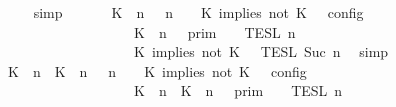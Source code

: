 \begin{isabellebody}
\ \ \ \ \isamarkupfalse%
\ simp\isanewline
\ \ \isamarkupfalse%
\ \isamarkupfalse%
\ {\isacartoucheopen}{\isasymlbrakk}\ {\isacharparenleft}{\isacharparenleft}K\ {\isasymnot}{\isasymUp}\ n{\isacharparenright}\ {\isacharhash}\ {\isasymGamma}{\isacharparenright}{\isacharcomma}\ n\ {\isasymturnstile}\ {\isasymPsi}\ {\isasymtriangleright}\ {\isacharparenleft}{\isacharparenleft}K\ implies\ not\ K\ {\isacharhash}\ {\isasymPhi}{\isacharparenright}\ {\isasymrbrakk}\isactrlsub c\isactrlsub o\isactrlsub n\isactrlsub f\isactrlsub i\isactrlsub g\isanewline
\ \ \ \ \ \ \ \ \ \ \ \ \ \ \ \ \ \ {\isacharequal}\ {\isasymlbrakk}{\isasymlbrakk}\ {\isacharparenleft}K\ {\isasymnot}{\isasymUp}\ n{\isacharparenright}\ {\isacharhash}\ {\isasymGamma}\ {\isasymrbrakk}{\isasymrbrakk}\isactrlsub p\isactrlsub r\isactrlsub i\isactrlsub m\ {\isasyminter}\ {\isasymlbrakk}{\isasymlbrakk}\ {\isasymPsi}\ {\isasymrbrakk}{\isasymrbrakk}\isactrlsub T\isactrlsub E\isactrlsub S\isactrlsub L\isactrlbsup {\isasymge}\ n\isactrlesup \isanewline
\ \ \ \ \ \ \ \ \ \ \ \ \ \ \ \ \ \ {\isasyminter}\ {\isasymlbrakk}{\isasymlbrakk}\ {\isacharparenleft}K\ implies\ not\ K\ {\isacharhash}\ {\isasymPhi}\ {\isasymrbrakk}{\isasymrbrakk}\isactrlsub T\isactrlsub E\isactrlsub S\isactrlsub L\isactrlbsup {\isasymge}\ Suc\ n\isactrlesup {\isacartoucheclose}\ \isamarkupfalse%
\ simp\isanewline
\ \ \isamarkupfalse%
\ \isamarkupfalse%
\ {\isacartoucheopen}{\isasymlbrakk}\ {\isacharparenleft}{\isacharparenleft}K\ {\isasymUp}\ n{\isacharparenright}\ {\isacharhash}\ {\isacharparenleft}K\ {\isasymnot}{\isasymUp}\ n{\isacharparenright}\ {\isacharhash}\ {\isasymGamma}{\isacharparenright}{\isacharcomma}\ n\ {\isasymturnstile}\ {\isasymPsi}\ {\isasymtriangleright}\ {\isacharparenleft}{\isacharparenleft}K\ implies\ not\ K\ {\isacharhash}\ {\isasymPhi}{\isacharparenright}\ {\isasymrbrakk}\isactrlsub c\isactrlsub o\isactrlsub n\isactrlsub f\isactrlsub i\isactrlsub g\isanewline
\ \ \ \ \ \ \ \ \ \ \ \ \ \ \ \ \ \ {\isacharequal}\ {\isasymlbrakk}{\isasymlbrakk}\ {\isacharparenleft}{\isacharparenleft}K\ {\isasymUp}\ n{\isacharparenright}\ {\isacharhash}\ {\isacharparenleft}K\ {\isasymnot}{\isasymUp}\ n{\isacharparenright}\ {\isacharhash}\ {\isasymGamma}{\isacharparenright}\ {\isasymrbrakk}{\isasymrbrakk}\isactrlsub p\isactrlsub r\isactrlsub i\isactrlsub m\ {\isasyminter}\ {\isasymlbrakk}{\isasymlbrakk}\ {\isasymPsi}\ {\isasymrbrakk}{\isasymrbrakk}\isactrlsub T\isactrlsub E\isactrlsub S\isactrlsub L\isactrlbsup {\isasymge}\ n\isactrlesup \isanewline

\end{isabellebody}
